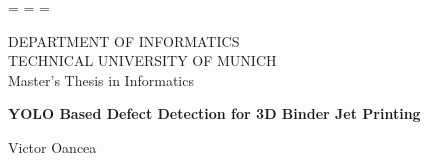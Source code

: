 \begin{titlepage}
  \oddsidemargin=\evensidemargin\relax
  \textwidth=\dimexpr{}\evensidemargin-2in\relax
  \hsize=\textwidth\relax

  \centering


  \vspace{5mm}
  {\huge\MakeUppercase{Department of Informatics}}\\

  \vspace{5mm}
  {\large\MakeUppercase{Technical University of Munich}}\\

  \vspace{20mm}
  {\Large Master's Thesis in Informatics}

  \vspace{15mm}
  {\huge\bfseries YOLO Based Defect Detection for 3D Binder Jet Printing}

  \vspace{15mm}
  {\LARGE Victor Oancea}

\end{titlepage}
